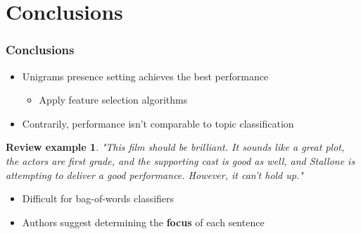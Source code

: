 \documentclass{beamer}
\newtheorem{snt}{Review example}
\begin{document}
\section{Conclusions}
\begin{frame}
	\frametitle{Conclusions}
	\begin{itemize}
		\item Unigrams presence setting achieves the best performance
		\begin{itemize}
			\item Apply feature selection algorithms
		\end{itemize}
		\item Contrarily, performance isn't comparable to topic classification 
	\end{itemize}
	
	\begin{snt}
		"This film should be brilliant. It sounds like a great plot, the actors are first grade, and the supporting cast is good as well, and Stallone is attempting to deliver a good performance. However, it can't hold up."
	\end{snt}
	\pause
	
	\begin{itemize}
		\item Difficult for bag-of-words classifiers
		\item Authors suggest determining the \textbf{focus} of each sentence
	\end{itemize}
\end{frame}

\iffalse
\end{document}

